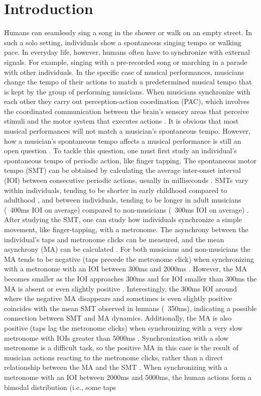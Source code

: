 \documentclass{report}
\begin{document}
\section{Introduction}
Humans can seamlessly sing a song in the shower or walk on an empty street. In such a solo setting, individuals show a spontaneous singing tempo or walking pace. In everyday life, however, humans often have to synchronize with external signals. For example, singing with a pre-recorded song or marching in a parade with other individuals. In the specific case of musical performances, musicians change the tempo of their actions to match a predetermined musical tempo that is kept by the group of performing musicians. When musicians synchronize with each other they carry out perception-action coordination (PAC), which involves the coordinated communication between the brain's sensory areas that perceive stimuli and the motor system that executes actions \cite{ridderinkhof2014neurocognitive}. It is obvious that most musical performances will not match a musician's spontaneous tempo. However, how a musician's spontaneous tempo affects a musical performance is still an open question \cite{zamm2018musicians}. To tackle this question, one must first study an individual's spontaneous tempo of periodic action, like finger tapping. The spontaneous motor tempo (SMT) can be obtained by calculating the average inter-onset interval (IOI) between consecutive periodic actions, usually in milliseconds \cite{mcauley2006time}. SMTs vary within individuals, tending to be shorter in early childhood compared to adulthood \cite{mcauley2006time}, and between individuals, tending to be longer in adult musicians (~400ms IOI on average) compared to non-musicians (~300ms IOI on average) \cite{scheurich2016spontaneous, drake2000tapping}. After studying the SMT, one can study how individuals synchronize a simple movement, like finger-tapping, with a metronome. The asynchrony between the individual's taps and metronome clicks can be measured, and the mean asynchrony (MA) can be calculated \cite{repp2005sensorimotor, repp2013sensorimotor}. For both musicians and non-musicians the MA tends to be negative (taps precede the metronome click) when synchronizing with a metronome with an IOI between 300ms and 2000ms \cite{mates1994temporal}. However, the MA becomes smaller as the IOI approaches 300ms and for IOI smaller than 300ms the MA is absent or even slightly positive \cite{repp2003rate, wohlschlager1999synchronization}. Interestingly, the 300ms IOI around where the negative MA disappears and sometimes is even slightly positive coincides with the mean SMT observed in humans (~350ms), indicating a possible connection between SMT and MA dynamics. Additionally, the MA is also positive (taps lag the metronome clicks) when synchronizing with a very slow metronome with IOIs greater than 5000ms \cite{miyake2004two}. Synchronization with a slow metronome is a difficult task, so the positive MA in this case is the result of musician actions reacting to the metronome clicks, rather than a direct relationship between the MA and the SMT \cite{repp2007tapping}. When synchronizing with a metronome with an IOI between 2000ms and 5000ms, the human actions form a bimodal distribution (i.e., some taps 
\end{document}
